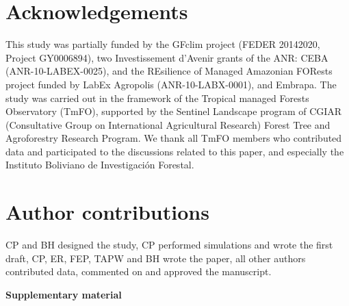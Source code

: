 \documentclass[12pt]{article}
\newcommand{\beginsupplement}{%
        \setcounter{table}{0}
        \renewcommand{\thetable}{S\arabic{table}}%
        \setcounter{figure}{0}
        \renewcommand{\thefigure}{S\arabic{figure}}%
     }
\begin{document}


\section*{Acknowledgements}

This study was partially funded by the GFclim project (FEDER 20142020, Project GY0006894), two Investissement d’Avenir grants of the ANR: CEBA (ANR-10-LABEX-0025), and the REsilience of Managed Amazonian FORests project funded by LabEx Agropolis (ANR-10-LABX-0001), and Embrapa. The study was carried out in the framework of the Tropical managed Forests Observatory (TmFO), supported by the Sentinel Landscape program of CGIAR (Consultative Group on International Agricultural Research) Forest Tree and Agroforestry Research Program. We thank all TmFO members who contributed data and participated to the discussions related to this paper, and especially the Instituto Boliviano de Investigaci\'on Forestal.

\section*{Author contributions}
CP and BH designed the study, CP performed simulations and wrote the first draft, CP, ER, FEP, TAPW and BH wrote the paper, all other authors contributed data, commented on and approved the manuscript.

\clearpage





\onecolumn
\beginsupplement
\appendix
\begin{center}
    { \huge \textbf{Supplementary material}}
\end{center} 
\end{document}
